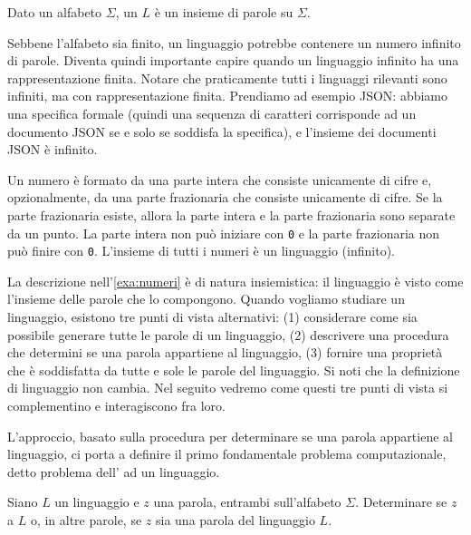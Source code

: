 \begin{definition}[Linguaggio]\label{def:linguaggio}
Dato un alfabeto $\Sigma$, un  $L$ è un insieme di parole su $\Sigma$.
\end{definition}

Sebbene l'alfabeto sia finito, un linguaggio potrebbe contenere un numero
infinito di parole.
Diventa quindi importante capire quando un linguaggio infinito ha una
rappresentazione finita.
Notare che praticamente tutti i linguaggi rilevanti sono infiniti, ma con
rappresentazione finita.
Prendiamo ad esempio JSON: abbiamo una specifica formale (quindi una sequenza di
caratteri corrisponde ad un documento JSON se e solo se soddisfa la specifica),
e l'insieme dei documenti JSON è infinito.

\begin{example}\label{exa:numeri}
Un numero è formato da una parte intera che consiste unicamente di cifre e,
opzionalmente, da una parte frazionaria che consiste unicamente di cifre.
Se la parte frazionaria esiste, allora la parte intera e la parte frazionaria
sono separate da un punto.
La parte intera non può iniziare con \texttt{0} e la parte frazionaria non può
finire con \texttt{0}.
L'insieme di tutti i numeri è un linguaggio (infinito).
\end{example}

La descrizione nell'\cref{exa:numeri} è di natura insiemistica:  il
linguaggio è visto come l'insieme delle parole che lo compongono.
Quando vogliamo studiare un linguaggio, esistono tre punti di vista alternativi: (1) considerare come sia possibile generare
tutte le parole di un linguaggio, (2) descrivere una procedura che determini se
una parola appartiene al linguaggio, (3) fornire una proprietà che è soddisfatta da tutte e sole le parole del linguaggio.
Si noti che la definizione di linguaggio non cambia.
Nel seguito vedremo come questi tre punti di vista si complementino e
interagiscono fra loro.

L'approccio, basato sulla procedura per determinare se una parola
appartiene al linguaggio, ci porta a definire il primo fondamentale problema
computazionale, detto problema dell' ad un linguaggio.


\begin{problem}[Appartenenza]\label{pb:appartenenza}
Siano $L$ un linguaggio e $z$ una parola, entrambi sull'alfabeto $\Sigma$.
Determinare se $z$  a $L$ o, in altre parole, se $z$ sia una parola del linguaggio $L$.
\end{problem}

